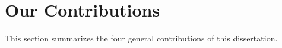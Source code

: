 
\section{Our Contributions}
\label{sect:overview--contributions}

This section summarizes the four general contributions of this dissertation.

